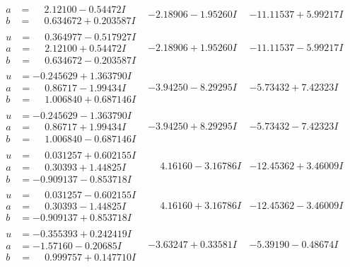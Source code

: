\documentclass[1p]{elsarticle_modified}
\theoremstyle{definition}
\begin{document}
$$\begin{array}{c|c|c}
\begin{aligned}
a &= \phantom{-}2.12100 - 0.54472 I \\
b &= \phantom{-}0.634672 + 0.203587 I\end{aligned}
 & -2.18906 - 1.95260 I & -11.11537 + 5.99217 I \\ \hline\begin{aligned}
u &= \phantom{-}0.364977 - 0.517927 I \\
a &= \phantom{-}2.12100 + 0.54472 I \\
b &= \phantom{-}0.634672 - 0.203587 I\end{aligned}
 & -2.18906 + 1.95260 I & -11.11537 - 5.99217 I \\ \hline\begin{aligned}
u &= -0.245629 + 1.363790 I \\
a &= \phantom{-}0.86717 - 1.99434 I \\
b &= \phantom{-}1.006840 + 0.687146 I\end{aligned}
 & -3.94250 - 8.29295 I & -5.73432 + 7.42323 I \\ \hline\begin{aligned}
u &= -0.245629 - 1.363790 I \\
a &= \phantom{-}0.86717 + 1.99434 I \\
b &= \phantom{-}1.006840 - 0.687146 I\end{aligned}
 & -3.94250 + 8.29295 I & -5.73432 - 7.42323 I \\ \hline\begin{aligned}
u &= \phantom{-}0.031257 + 0.602155 I \\
a &= \phantom{-}0.30393 + 1.44825 I \\
b &= -0.909137 - 0.853718 I\end{aligned}
 & \phantom{-}4.16160 - 3.16786 I & -12.45362 + 3.46009 I \\ \hline\begin{aligned}
u &= \phantom{-}0.031257 - 0.602155 I \\
a &= \phantom{-}0.30393 - 1.44825 I \\
b &= -0.909137 + 0.853718 I\end{aligned}
 & \phantom{-}4.16160 + 3.16786 I & -12.45362 - 3.46009 I \\ \hline\begin{aligned}
u &= -0.355393 + 0.242419 I \\
a &= -1.57160 - 0.20685 I \\
b &= \phantom{-}0.999757 + 0.147710 I\end{aligned}
 & -3.63247 + 0.33581 I & -5.39190 - 0.48674 I \\ \hline\begin{aligned}

\end{aligned}
\end{array}$$
\end{document}

